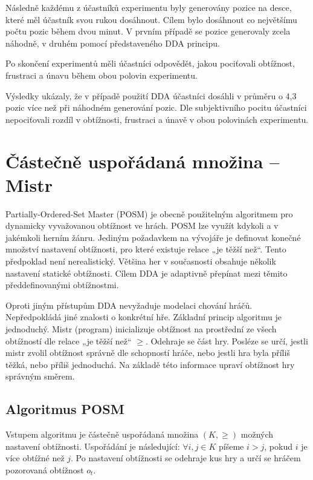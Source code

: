 Následně každému z účastníků experimentu byly generovány pozice na desce, které měl účastník svou rukou dosáhnout. Cílem bylo dosáhnout co největšímu počtu pozic během dvou minut. V prvním případě se pozice generovaly zcela náhodně, v druhém pomocí představeného DDA principu.

Po skončení experimentů měli účastníci odpovědět, jakou pociťovali obtížnost, frustraci a únavu během obou polovin experimentu.

Výsledky ukázaly, že v případě použití DDA účastníci dosáhli v průměru o 4,3 pozic více než při náhodném generování pozic. Dle subjektivního pocitu účastníci nepociťovali rozdíl v obtížnosti, frustraci a únavě v obou polovinách experimentu.

\section{Částečně uspořádaná množina – Mistr}

Partially-Ordered-Set Master (POSM) \cite{22posm1} je obecně použitelným algoritmem pro dynamicky vyvažovanou obtížnost ve hrách. POSM lze využít kdykoli a v jakémkoli herním žánru. Jediným požadavkem na vývojáře je definovat konečné množství nastavení obtížnosti, pro které existuje relace „je těžší než“. Tento předpoklad není nerealistický. Většina her v současnosti obsahuje několik nastavení statické obtížnosti. Cílem DDA je adaptivně přepínat mezi těmito předdefinovanými obtížnostmi.

Oproti jiným přístupům DDA nevyžaduje modelaci chování hráčů. Nepředpokládá jiné znalosti o konkrétní hře. 
Základní princip algoritmu je jednoduchý. Mistr (program) inicializuje obtížnost na prostřední ze všech obtížností dle relace „je těžší než“ $\geq$. Odehraje se část hry. Posléze se určí, jestli mistr zvolil obtížnost správně dle schopností hráče, nebo jestli hra byla příliš těžká, nebo příliš jednoduchá. Na základě této informace upraví obtížnost hry správným směrem.

\subsection{Algoritmus POSM}

Vstupem algoritmu je částečně uspořádaná množina $(K,\geq)$ možných nastavení obtížnosti. Uspořádání je následující: $\forall i,j \in K$ píšeme $i>j$, pokud $i$ je více obtížné než $j$.
Po nastavení obtížnosti se odehraje kus hry a určí se hráčem pozorovaná obtížnost $o_t$.

